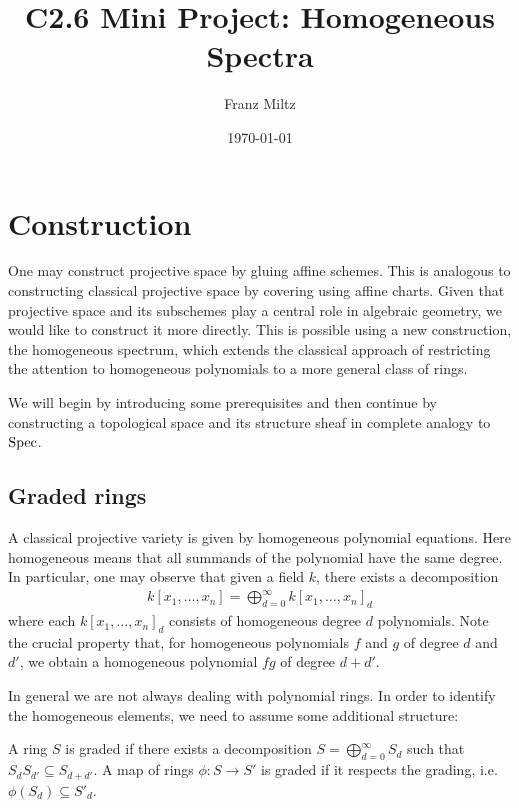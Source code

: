 \documentclass{article}
\begin{document}
\title{C2.6 Mini Project: Homogeneous Spectra}
\author{Franz Miltz}
\date{\today}
\maketitle

\section{Construction}

One may construct projective space by gluing affine schemes.
This is analogous to constructing classical projective space by covering
using affine charts. Given that projective space and its subschemes
play a central role in algebraic geometry, we would like to construct
it more directly. This is possible using a new construction, the
homogeneous spectrum, which extends the classical approach of restricting
the attention to homogeneous polynomials to a more general class of rings.

We will begin by introducing some prerequisites and then continue by
constructing a topological space and its structure sheaf in
complete analogy to $\operatorname{Spec}$.

\subsection{Graded rings}

A classical projective variety is given by homogeneous polynomial
equations. Here homogeneous means that all summands of the polynomial
have the same degree. In particular, one may observe that given a field $k$,
there exists a decomposition
\begin{align*}
  k[x_1,\ldots,x_n] = \bigoplus_{d=0}^\infty k[x_1,\ldots,x_n]_d
\end{align*}
where each $k[x_1,\ldots,x_n]_d$ consists of homogeneous degree $d$
polynomials. Note the crucial property that, for homogeneous polynomials $f$
and $g$ of degree $d$ and $d'$, we obtain a homogeneous polynomial $fg$ of
degree $d+d'$.

In general we are not always dealing with polynomial rings. In order
to identify the homogeneous elements, we need to assume some
additional structure:

\begin{definition}
  A ring $S$ is graded if there exists a decomposition
  $S = \bigoplus_{d=0}^\infty S_d$
  such that $S_d S_{d'} \subseteq S_{d+d'}$.
  A map of rings $\phi : S\to S'$ is graded if it
  respects the grading, i.e. $\phi(S_d) \subseteq S'_d$.
\end{definition}
\end{document}
